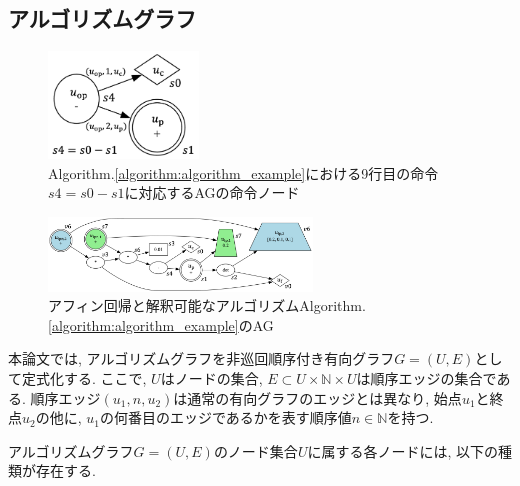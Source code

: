 \documentclass[a4paper,11pt,twocolumn]{jarticle}
\begin{document}
\subsection{アルゴリズムグラフ}

\begin{figure}
  \centering
  \includegraphics[width=4cm]{op_node.png}
  \caption{Algorithm.\ref{algorithm:algorithm_example}における9行目の命令$s4 = s0 - s1$に対応するAGの命令ノード}
  \label{fig:op_node}
\end{figure}

\begin{figure}
  \centering
  \includegraphics[width=7cm]{affine.png}
  \caption{アフィン回帰と解釈可能なアルゴリズムAlgorithm.\ref{algorithm:algorithm_example}のAG}
  \label{fig:ag_algorithm_example}
\end{figure}

本論文では, アルゴリズムグラフを非巡回順序付き有向グラフ$G = (U, E)$として定式化する. ここで, $U$はノードの集合, $E \subset U \times \mathbb{N} \times U$は順序エッジの集合である. 順序エッジ$(u_1, n, u_2)$は通常の有向グラフのエッジとは異なり, 始点$u_1$と終点$u_2$の他に, $u_1$の何番目のエッジであるかを表す順序値$n \in \mathbb{N}$を持つ.

アルゴリズムグラフ$G = (U, E)$のノード集合$U$に属する各ノードには, 以下の種類が存在する.
\end{document}
